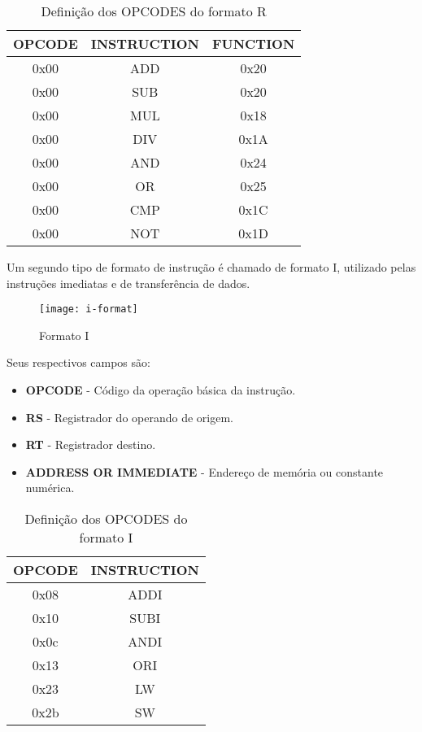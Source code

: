 \begin{table}[H]
\centering
	\begin{tabular}{|c|c|c|}
  	\hline 
  	\cellcolor[gray]{0.9}\textbf{OPCODE} & \cellcolor[gray]{0.9}\textbf{INSTRUCTION} & \cellcolor[gray]{0.9}\textbf{FUNCTION} \\ 
  	\hline 
  	0x00 & ADD & 0x20 \\ 
  	\hline 
  	0x00 & SUB & 0x20 \\ 
  	\hline 
  	0x00 & MUL & 0x18 \\ 
  	\hline 
  	0x00 & DIV & 0x1A \\ 
  	\hline 
  	0x00 & AND & 0x24 \\ 
  	\hline 
  	0x00 & OR & 0x25 \\ 
  	\hline 
  	0x00 & CMP & 0x1C \\ 
  	\hline 
  	0x00 & NOT & 0x1D \\ 
  	\hline 
  	\end{tabular} 
  	\caption{Definição dos OPCODES do formato R}
  \end{table} 
  	 	
  	
	 Um segundo tipo de formato de instrução é chamado de formato I, utilizado pelas instruções imediatas e de transferência de dados.
	\begin{figure}[H]
    	\centering
    	\texttt{[image: i-format]}
    	\caption{Formato I}
		\label{i_format}
  	\end{figure}
Seus respectivos campos são:
	\begin{itemize}
	\item \textbf{OPCODE} - Código da operação básica da instrução.
	\item \textbf{RS} - Registrador do operando de origem.
	\item \textbf{RT} - Registrador destino.
	\item \textbf{ADDRESS OR IMMEDIATE} - Endereço de memória ou constante numérica.
\end{itemize}	  	

\begin{table}[H]
\centering	
\begin{tabular}{|c|c|}
	\hline 
  	\cellcolor[gray]{0.9}\textbf{OPCODE} & \cellcolor[gray]{0.9}\textbf{INSTRUCTION} \\ 
	\hline 
	0x08 & ADDI \\ %
	\hline 
	0x10 & SUBI \\ %
	\hline 
	0x0c & ANDI \\ %
	\hline 
	0x13 & ORI \\ %
	\hline 
	0x23 & LW \\ %
	\hline 
	0x2b & SW \\ %
	\hline 
	\end{tabular} 
	  	\caption{Definição dos OPCODES do formato I}	
\end{table}	
	
